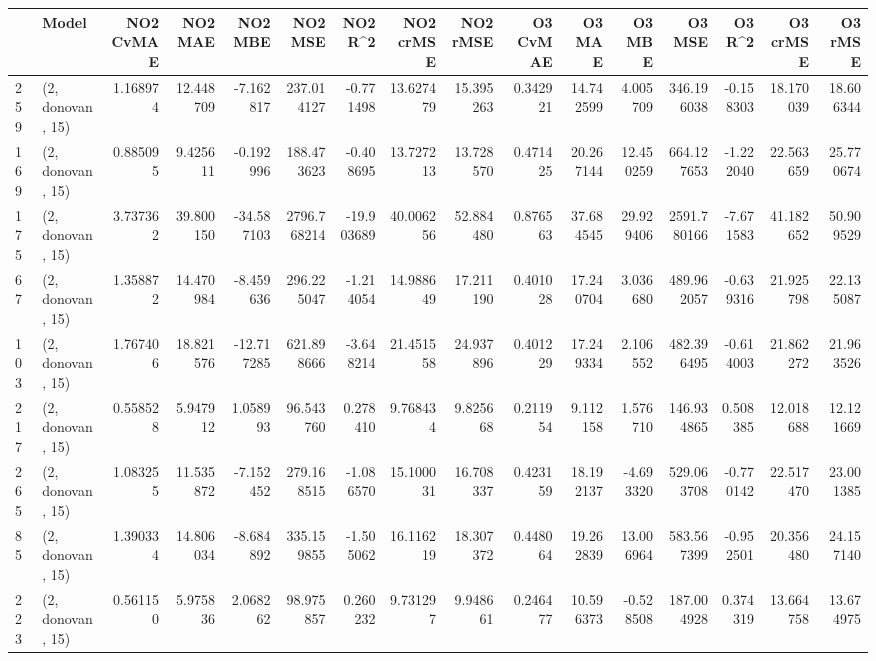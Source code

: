 \begin{tabular}{llrrrrrrrrrrrrrr}
\toprule
{} &             Model &  NO2 CvMAE &    NO2 MAE &    NO2 MBE &      NO2 MSE &    NO2 R\textasciicircum2 &  NO2 crMSE &   NO2 rMSE &  O3 CvMAE &     O3 MAE &     O3 MBE &       O3 MSE &    O3 R\textasciicircum2 &   O3 crMSE &    O3 rMSE \\
\midrule
259 &  (2, donovan, 15) &   1.168974 &  12.448709 &  -7.162817 &   237.014127 &  -0.771498 &  13.627479 &  15.395263 &  0.342921 &  14.742599 &   4.005709 &   346.196038 & -0.158303 &  18.170039 &  18.606344 \\
169 &  (2, donovan, 15) &   0.885095 &   9.425611 &  -0.192996 &   188.473623 &  -0.408695 &  13.727213 &  13.728570 &  0.471425 &  20.267144 &  12.450259 &   664.127653 & -1.222040 &  22.563659 &  25.770674 \\
175 &  (2, donovan, 15) &   3.737362 &  39.800150 & -34.587103 &  2796.768214 & -19.903689 &  40.006256 &  52.884480 &  0.876563 &  37.684545 &  29.929406 &  2591.780166 & -7.671583 &  41.182652 &  50.909529 \\
67  &  (2, donovan, 15) &   1.358872 &  14.470984 &  -8.459636 &   296.225047 &  -1.214054 &  14.988649 &  17.211190 &  0.401028 &  17.240704 &   3.036680 &   489.962057 & -0.639316 &  21.925798 &  22.135087 \\
103 &  (2, donovan, 15) &   1.767406 &  18.821576 & -12.717285 &   621.898666 &  -3.648214 &  21.451558 &  24.937896 &  0.401229 &  17.249334 &   2.106552 &   482.396495 & -0.614003 &  21.862272 &  21.963526 \\
217 &  (2, donovan, 15) &   0.558528 &   5.947912 &   1.058993 &    96.543760 &   0.278410 &   9.768434 &   9.825668 &  0.211954 &   9.112158 &   1.576710 &   146.934865 &  0.508385 &  12.018688 &  12.121669 \\
265 &  (2, donovan, 15) &   1.083255 &  11.535872 &  -7.152452 &   279.168515 &  -1.086570 &  15.100031 &  16.708337 &  0.423159 &  18.192137 &  -4.693320 &   529.063708 & -0.770142 &  22.517470 &  23.001385 \\
85  &  (2, donovan, 15) &   1.390334 &  14.806034 &  -8.684892 &   335.159855 &  -1.505062 &  16.116219 &  18.307372 &  0.448064 &  19.262839 &  13.006964 &   583.567399 & -0.952501 &  20.356480 &  24.157140 \\
223 &  (2, donovan, 15) &   0.561150 &   5.975836 &   2.068262 &    98.975857 &   0.260232 &   9.731297 &   9.948661 &  0.246477 &  10.596373 &  -0.528508 &   187.004928 &  0.374319 &  13.664758 &  13.674975 \\

\end{tabular}
